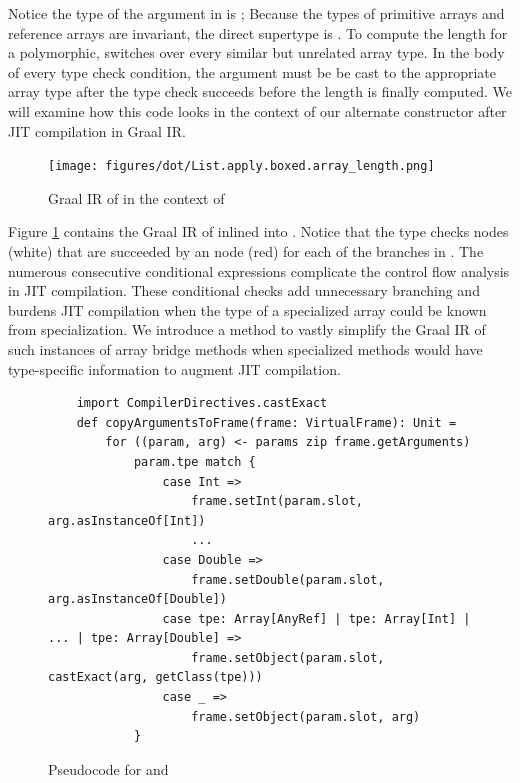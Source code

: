 Notice the type of the argument in  is ; Because the types of primitive arrays and reference arrays are invariant, the direct supertype is .
To compute the length for a polymorphic,  switches over every similar but unrelated array type.
In the body of every type check condition, the argument must be be cast to the appropriate array type after the type check succeeds before the length is finally computed.
We will examine how this code looks in the context of our alternate constructor after JIT compilation in Graal IR.

\begin{figure}
	\centering
	\texttt{[image: figures/dot/List.apply.boxed.array\_length.png]}
	\caption{Graal IR of  in the context of }
	\label{graalir:list-apply-boxed-array-length}
\end{figure}

Figure \ref{graalir:list-apply-boxed-array-length} contains the Graal IR of  inlined into . 
Notice that the  type checks nodes (white) that are succeeded by an  node (red) for each of the branches in .
The numerous consecutive conditional expressions complicate the control flow analysis in JIT compilation.
These conditional checks add unnecessary branching and burdens JIT compilation when the type of a specialized array could be known from specialization.
We introduce a method to vastly simplify the Graal IR of such instances of array bridge methods when specialized methods would have type-specific information to augment JIT compilation.

\begin{figure}[!htb]
	\begin{verbatim}
	import CompilerDirectives.castExact
	def copyArgumentsToFrame(frame: VirtualFrame): Unit = 
		for ((param, arg) <- params zip frame.getArguments) 
			param.tpe match {
				case Int =>
					frame.setInt(param.slot, arg.asInstanceOf[Int])
					...
				case Double =>
					frame.setDouble(param.slot, arg.asInstanceOf[Double])	
				case tpe: Array[AnyRef] | tpe: Array[Int] | ... | tpe: Array[Double] =>
					frame.setObject(param.slot, castExact(arg, getClass(tpe)))
				case _ =>
					frame.setObject(param.slot, arg)
			}
	\end{verbatim}
	\caption{Pseudocode for  and }
	\label{impl:specialized-copy-arguments}
\end{figure}

